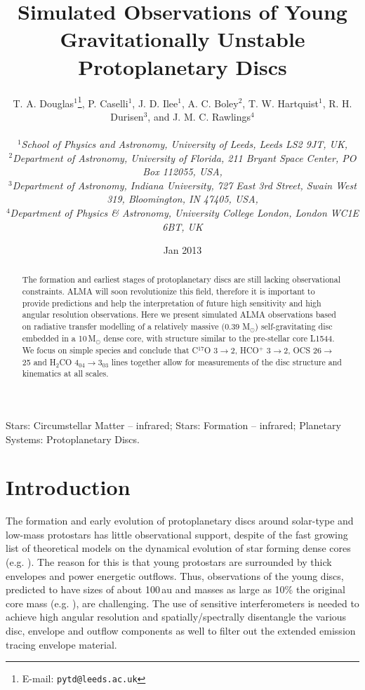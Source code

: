 \documentclass[useAMS,usenatbib]{mn2e}
\title[Young protoplanetary discs]{Simulated Observations of Young Gravitationally Unstable Protoplanetary Discs}
\author[T.~A.~Douglas et al.]
{\parbox{\textwidth}{T. A. Douglas$^{1}$\thanks{E-mail: \texttt{pytd@leeds.ac.uk}},
P. Caselli$^{1}$,
J. D. Ilee$^{1}$,
A. C. Boley$^{2}$,
T. W. Hartquist$^{1}$,
R. H. Durisen$^{3}$, and
J. M. C. Rawlings$^{4}$\\
\vspace{0.1cm}\\
{\small{\it$^{1}$School of Physics and Astronomy, University of Leeds, Leeds LS2 9JT, UK,}} \\
{\small{\it$^{2}$Department of Astronomy, University of Florida, 211 Bryant Space Center, PO Box 112055, USA,}}\\
{\small{\it$^{3}$Department of Astronomy, Indiana University, 727 East 3rd Street, Swain West 319, Bloomington, IN 47405, USA,}}\\
{\small{\it$^{4}$Department of Physics \& Astronomy, University College London, London WC1E 6BT, UK}}\\}}
\begin{document}
\date{Jan 2013}

\pagerange{\pageref{firstpage}--\pageref{lastpage}} 

\maketitle

\label{firstpage}

\begin{abstract}
The formation and earliest stages of protoplanetary discs are still lacking observational constraints. ALMA will soon revolutionize this field, therefore it is important to provide predictions and help the interpretation of future high sensitivity and high angular resolution observations. Here we present simulated ALMA observations based on radiative transfer modelling of a relatively massive (0.39 M$_{\odot}$) self-gravitating disc embedded in a 10\,M$_{\odot}$ dense core, with structure similar to the pre-stellar core L1544. We focus on simple species and conclude that  C$^{17}$O 3$\rightarrow$2, HCO$^+$ 3$\rightarrow$2, OCS 26$\rightarrow$25 and H$_2$CO 4$_{04}\rightarrow$3$_{03}$ lines together allow for measurements of the disc structure and kinematics at all scales. 
\end{abstract}

\begin{keywords}
Stars: Circumstellar Matter -- infrared; Stars: Formation -- infrared; Planetary Systems: Protoplanetary Discs.
\end{keywords}

\section{Introduction}

The formation and early evolution of protoplanetary discs around solar-type and low-mass protostars has little observational support, despite of the fast growing list of theoretical models on the dynamical evolution of star forming dense cores (e.g. \citealt{Krasnopolsky2011,Machida2011,Braiding2012,Joos2013}). The reason for this is that young protostars are surrounded by thick envelopes and power energetic outflows. Thus, observations of the young discs, predicted to have sizes of about 100\,au and masses as large as 10\% the original core mass (e.g. \citealt{Joos2012}), are challenging. The use of sensitive interferometers is needed to achieve high angular resolution and spatially/spectrally disentangle the various disc, envelope and outflow components as well to filter out the extended emission tracing envelope material. \smallskip
\end{document}
